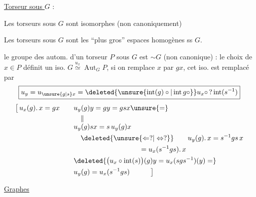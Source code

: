 \uline{Torseur sous $G$} :
{\small
{}}


Les torseurs sous $G$ sont isomorphes (non canoniquement)

Les torseurs sous $G$ sont les ``plus gros'' espaces homogènes ss $G$.

le groupe des autom. d'un torseur $P$ sous $G$ est $\sim G$ (non canonique) : le choix de $x\in P$ définit un iso. $G\overset{u_x}{\simeq}\operatorname{Aut}_{G}P$, si on remplace $x$ par $gx$, cet iso. est remplacé par
\[
\boxed{u_y=u_{\unsure{g|s}x}=\deleted{\unsure{\operatorname{int}(g)\circ|\operatorname{int}g\circ}}u_x\circ\,?\operatorname{int}(s^{-1})}
\]
{\small
\[
\begin{aligned}
\bigl[\,u_x(g).\,x=gx\qquad &u_y(g)y=gy=gsx\unsure{=}\\
&\quad\Vert\\[-3pt]
&u_y(g)sx=s\,u_y(g)x
\\
&\hspace{1em}\deleted{\unsure{\Leftarrow ?|\Leftrightarrow ?}} \qquad u_y(g).\,x=s^{-1}gs\,x\\
&\hspace{9.4em}=u_x(s^{-1}gs).\,x\\
&\deleted{\bigl(u_x\circ\operatorname{int}(s)\bigr)(g)y=u_x(sgs^{-1})(y)=}\\
&u_y(g)=u_x(s^{-1}gs)\hspace{3em}\bigr]
\end{aligned}
\]}


\uline{Graphes}

